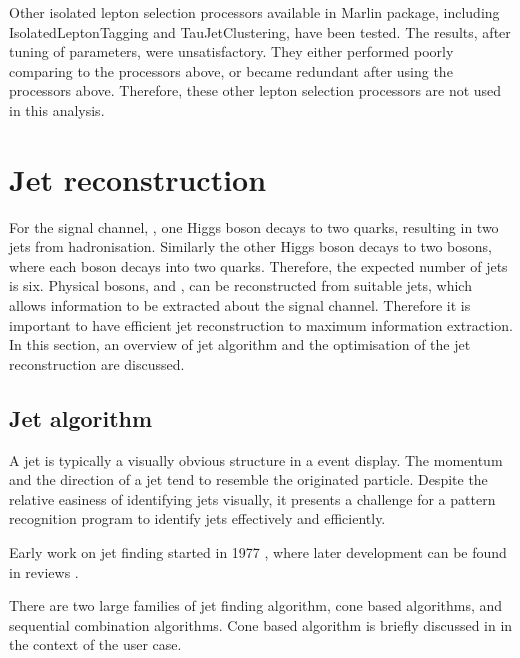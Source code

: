 Other isolated lepton selection processors available in Marlin package, including IsolatedLeptonTagging and TauJetClustering, have been tested. The results, after tuning of parameters, were unsatisfactory. They either performed poorly comparing to the processors above, or became redundant after using the processors above. Therefore, these other lepton selection processors are not used in this analysis.


\section{Jet reconstruction}

For the signal channel, \eeToHHbbWWHad, one Higgs boson decays to two \Pbottom quarks, resulting in two jets from hadronisation. Similarly the other Higgs boson decays to two \PW bosons, where each \PW boson decays into two quarks. Therefore, the expected number of jets is six.  Physical bosons,  \PW and \PHiggs, can be reconstructed from suitable jets, which allows information to be extracted about the signal channel. Therefore it is important to have efficient jet reconstruction to maximum information extraction.  In this section, an overview of jet algorithm and the optimisation of the jet reconstruction are discussed.



\subsection{Jet algorithm}
\label{sec:doubleHiggsJetAlgorithm}
A jet is typically a visually obvious structure in a event display. The momentum and the direction of a jet tend to resemble the originated particle. Despite the relative easiness of identifying jets visually, it presents a challenge for a pattern recognition program to identify jets effectively and efficiently.

Early work on jet finding started in 1977 \cite{Sterman:1977wj}, where later development can be found in reviews \cite{Moretti:1998qx,Salam:2009jx,Ali:2010tw}.

There are two large families of jet finding algorithm, cone based algorithms, and sequential combination algorithms. Cone based algorithm is briefly discussed in  in the context of the \pandora user case.

